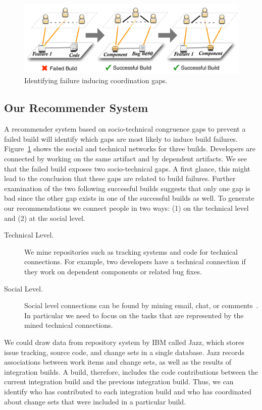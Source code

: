 \begin{figure}[t]
\centering
\includegraphics[width=0.9\columnwidth]{figures/bad-to-good}
\caption{Identifying failure inducing coordination gaps.}
\label{fig:multipleplanes}
\end{figure}

\subsection{Our Recommender System}
A recommender system based on socio-technical congruence gaps to prevent a failed build will identify which gaps are most likely to induce build failures. 
Figure~\ref{fig:multipleplanes} shows the social and technical networks for three builds. 
Developers are connected by working on the same artifact and by dependent artifacts. 
We see that the failed build exposes two socio-technical gaps. 
A first glance, this might lead to the conclusion that these gaps are related to build failures. 
Further examination of the two following successful builds suggests that only one gap is bad since the other gap exists in one of the successful builds as well. 
To generate our recommendations we connect people in two ways: (1) on the technical level and (2) at the social level. 

\begin{description}
\item[Technical Level.] 
We mine repositories such as tracking systems and code for technical connections. 
For example, two developers have a technical connection if they work on dependent components or related bug fixes.
\item[Social Level.]
Social level connections can be found by mining email, chat, or comments~\cite{cataldo:cscw:2006}. 
In particular we need to focus on the tasks that are represented by the mined technical connections. 
\end{description}

We could draw data from repository system by IBM called Jazz, which stores issue tracking, source code, and change sets in a single database. 
Jazz records associations between work items and change sets, as well as the results of integration builds. 
A build, therefore, includes the code contributions between the current integration build and the previous integration build. 
Thus, we can identify who has contributed to each integration build and who has coordinated about change sets that were included in a particular build.

